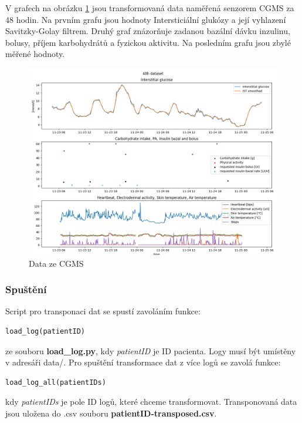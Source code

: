 V grafech na obrázku \ref{fig:48h_dataset} jsou transformovaná data naměřená senzorem CGMS za 48 hodin. Na prvním grafu jsou hodnoty Intersticiální glukózy a její vyhlazení Savitzky-Golay filtrem. Druhý graf znázorňuje zadanou bazální dávku inzulinu, bolusy, příjem karbohydrátů a fyzickou aktivitu. Na posledním grafu jsou zbylé měřené hodnoty.

\begin{figure}[H]
\caption{Data ze CGMS}
\label{fig:48h_dataset}
\centering
\includegraphics[width=1\textwidth]{img/cho/48h_dataset.png}
\end{figure}

\subsubsection{Spuštění}
Script pro transponaci dat se spustí zavoláním funkce:
\begin{verbatim}
load_log(patientID)
\end{verbatim}
ze souboru \textbf{load\_log.py}, kdy \textit{patientID} je ID pacienta. Logy musí být umístěny v adresáři data/. Pro spuštění transformace dat z více logů se zavolá funkce:
\begin{verbatim}
load_log_all(patientIDs)
\end{verbatim}
kdy \textit{patientIDs} je pole ID logů, které chceme transformovat. Transponovaná data jsou uložena do .csv souboru \textbf{patientID-transposed.csv}.


